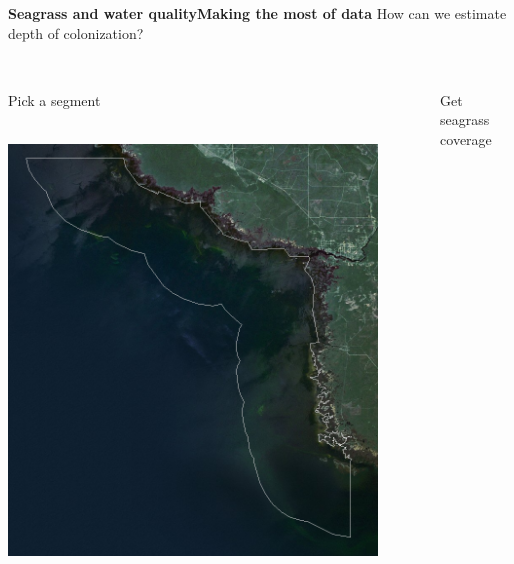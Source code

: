 \documentclass[serif]{beamer}\usepackage[]{graphicx}\usepackage[]{color}
\newenvironment{knitrout}{}{} %
\begin{document}
\begin{frame}{\textbf{Seagrass and water quality}}{\textbf{Making the most of data}}
\onslide<+->
How can we estimate depth of colonization? \\~\\
\begin{columns}[T]
\onslide<+->
\begin{column}{0.32\textwidth}
Pick a segment\\~\\
\centerline{\includegraphics[width = 0.9\textwidth]{fig/map820.png}}
\end{column}
\onslide<+->
\begin{column}{0.32\textwidth}
Get seagrass coverage
\begin{knitrout}
\color{fgcolor}


\end{knitrout}
\end{column}
\end{columns}
\end{frame}
\end{document}
